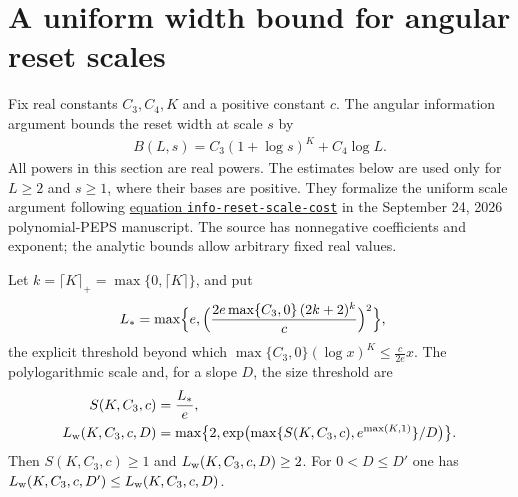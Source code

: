 \section{A uniform width bound for angular reset scales}
\label{sec:peps_angular_reset_width}

Fix real constants $C_3,C_4,K$ and a positive constant $c$.
The angular information argument bounds the reset width at scale $s$ by
\begin{align}
    B(L,s)=C_3(1+\log s)^K+C_4\log L.
    \label{eq:peps_angular_reset_cost}
\end{align}
All powers in this section are real powers. The estimates below are used
only for $L\ge2$ and $s\ge1$, where their bases are positive.
They formalize the uniform scale argument following
\href{https://github.com/openai/math/blob/adc7f1241b42e322a6451854ab7e4b4c146bf78a/preprints/Polynomial-PEPS-approximation-of-gapped-square-grid-ground-states-September-24-2026/build/sections/02-information.tex\#L744}{equation \texttt{info-reset-scale-cost}}
in the September 24, 2026 polynomial-PEPS manuscript.
The source has nonnegative coefficients and exponent; the analytic bounds
allow arbitrary fixed real values.

\begin{definition}
    \label{def:peps_angular_reset_width_constants}
    \leanok
    Let $k=\lceil K\rceil_+=\max\{0,\lceil K\rceil\}$, and put
    \begin{align}
        L_* & =\max\Bigl\{e,\Bigl(\frac{2e\max\{C_3,0\}\,(2k+2)^k}{c}\Bigr)^2\Bigr\},
        \notag
    \end{align}
    the explicit threshold beyond which
    $\max\{C_3,0\}(\log x)^K\le\frac{c}{2e}x$.
    The polylogarithmic scale and, for a slope $D$, the size threshold are
    \begin{align}
        S(K,C_3,c)           & =\frac{L_*}{e},                                   \notag                 \\
        L_{\rm w}(K,C_3,c,D) & =\max\bigl\{2,\exp\bigl(\max\{S(K,C_3,c),e^{\max(K,1)}\}/D\bigr)\bigr\}.
        \notag
    \end{align}
    Then $S(K,C_3,c)\ge1$ and $L_{\rm w}(K,C_3,c,D)\ge2$. For $0<D\le D'$ one has
    $L_{\rm w}(K,C_3,c,D')\le L_{\rm w}(K,C_3,c,D)$.
\end{definition}

